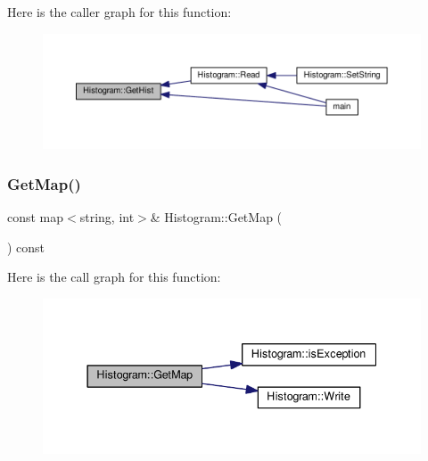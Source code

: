 Here is the caller graph for this function\+:
\nopagebreak
\begin{figure}[H]
\begin{center}
\leavevmode
\includegraphics[width=350pt]{class_histogram_afe807b7c5109c6a9781216961f2a9e90_icgraph}
\end{center}
\end{figure}
\mbox{\label{class_histogram_a605a2f87dcbe0c52e956ed6e559daf81}} 
\subsubsection{\texorpdfstring{Get\+Map()}{GetMap()}\hspace{0.1cm}{\footnotesize\ttfamily [1/2]}}
{\footnotesize\ttfamily const map$<$string, int$>$\& Histogram\+::\+Get\+Map (\begin{DoxyParamCaption}{ }\end{DoxyParamCaption}) const\hspace{0.3cm}{\ttfamily [inline]}}

Here is the call graph for this function\+:
\nopagebreak
\begin{figure}[H]
\begin{center}
\leavevmode
\includegraphics[width=337pt]{class_histogram_a605a2f87dcbe0c52e956ed6e559daf81_cgraph}
\end{center}
\end{figure}
\mbox{\label{class_histogram_a7a4b270eb5d88df6466cef9433a95d39}} 
